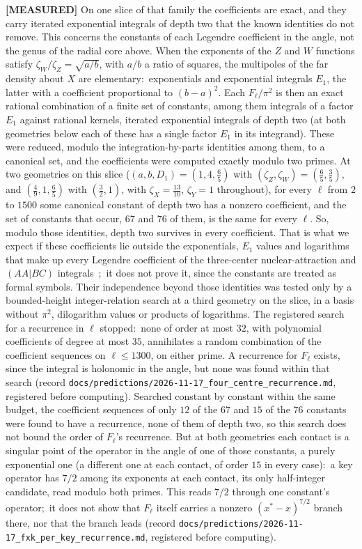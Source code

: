 \documentclass[aps,pra,twocolumn,superscriptaddress,longbibliography]{revtex4-2}
\begin{document}
\textbf{[MEASURED]} On one slice of that family the coefficients are
exact, and they carry iterated exponential integrals of depth two that the
known identities do not remove.  This concerns the constants of each
Legendre coefficient in the angle, not the genus of the radial core above.
When the exponents of the $Z$ and $W$ functions satisfy
$\zeta_W/\zeta_Z=\sqrt{a/b}$, with $a/b$ a ratio of squares, the multipoles
of the far density about $X$ are elementary:\ exponentials and exponential
integrals $E_1$, the latter with a coefficient proportional to $(b-a)^2$.
Each $F_\ell/\pi^2$ is then an exact rational combination of a finite set
of constants, among them integrals of a factor $E_1$ against rational
kernels, iterated exponential integrals of depth two (at both geometries
below each of these has a single factor $E_1$ in its integrand).  These were reduced, modulo the
integration-by-parts identities among them, to a canonical set, and the
coefficients were computed exactly modulo two primes.  At two geometries
on this slice ($(a,b,D_1)=(1,4,\tfrac65)$ with
$(\zeta_Z,\zeta_W)=(\tfrac65,\tfrac35)$, and $(\tfrac49,1,\tfrac65)$ with
$(\tfrac32,1)$, with $\zeta_X=\tfrac{13}{10}$, $\zeta_Y=1$ throughout),
for every $\ell$ from $2$ to $1500$ some canonical constant of depth two
has a nonzero coefficient, and the set of constants that occur, $67$ and
$76$ of them, is the same for every $\ell$.  So, modulo those identities,
depth two survives in every coefficient.  That is what we expect if these
coefficients lie outside the exponentials, $E_1$ values and logarithms that
make up every Legendre coefficient of the three-center nuclear-attraction
and $(AA|BC)$ integrals~\cite{loutey_paper59};\ it does not prove it, since
the constants are treated as formal symbols.  Their independence beyond
those identities was tested only by a bounded-height integer-relation
search at a third geometry on the slice, in a basis without $\pi^2$,
dilogarithm values or products of logarithms.  The registered search for
a recurrence in $\ell$ stopped:\ none of order at most $32$, with
polynomial coefficients of degree at most $35$, annihilates a random
combination of the coefficient sequences on $\ell\le1300$, on either
prime.  A recurrence for $F_\ell$ exists, since the integral is holonomic
in the angle, but none was found within that search (record
\texttt{docs/predictions/2026-11-17\_four\_centre\_recurrence.md},
registered before computing).  Searched constant by constant within the
same budget, the coefficient sequences of only $12$ of the $67$ and $15$ of
the $76$ constants were found to have a recurrence, none of them of depth
two, so this search does not bound the order of $F_\ell$'s recurrence.
But at both geometries each contact is a singular point of the operator in
the angle of one of those constants, a purely exponential one (a different
one at each contact, of order $15$ in every case):\ a key operator has
$7/2$ among its exponents at each contact, its only half-integer candidate,
read modulo both primes.  This reads $7/2$ through one constant's
operator;\ it does not show that $F_\ell$ itself carries
a nonzero $(x^{*}-x)^{7/2}$ branch there, nor that the branch leads (record
\texttt{docs/predictions/2026-11-17\_fxk\_per\_key\_recurrence.md},
registered before computing).
\end{document}
